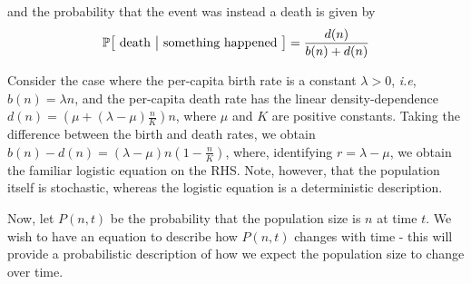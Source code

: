 and the probability that the event was instead a death is given by
\begin{equation*}
\mathbb{P\big[\textrm{ death } \big{|} \textrm{ something happened }\big]} = \frac{d(n)}{b(n)+d(n)}
\end{equation*}
\begin{example}\label{ex_1D_stoch_logistic}
	Consider the case where the per-capita birth rate is a constant $\lambda > 0$, \emph{i.e}, $b(n) = \lambda n$, and the per-capita death rate has the linear density-dependence $d(n) = \left(\mu + (\lambda-\mu)\frac{n}{K}\right)n$, where $\mu$ and $K$ are positive constants. Taking the difference between the birth and death rates, we obtain $b(n) - d(n) = (\lambda - \mu)n\left(1-\frac{n}{K}\right)$, where, identifying $r=\lambda-\mu$, we obtain the familiar logistic equation on the RHS. Note, however, that the population itself is stochastic, whereas the logistic equation is a deterministic description.
\end{example}
Now, let $P(n,t)$ be the probability that the population size is $n$ at time $t$. We wish to have an equation to describe how $P(n,t)$ changes with time - this will provide a probabilistic description of how we expect the population size to change over time.

